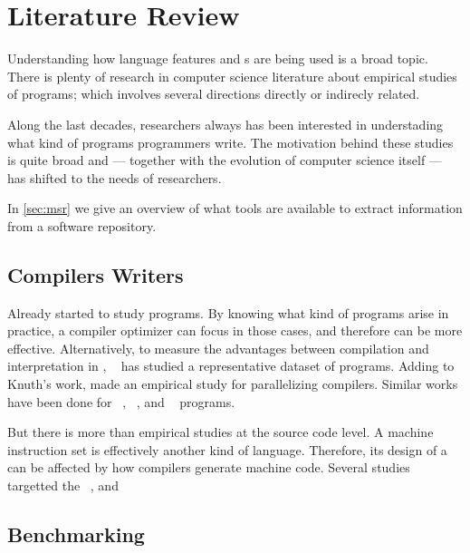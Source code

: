 
\chapter{Literature Review} \label{cha:literature-review} 

Understanding how language features and \api{}s are being used is a broad topic.
There is plenty of research in computer science literature about empirical studies of programs;
which involves several directions directly or indirecly related.

Along the last decades, researchers always has been interested in understading what kind of programs programmers write.
The motivation behind these studies is quite broad and --- together with the evolution of computer science itself --- has shifted to the needs of researchers.

In \cref{sec:msr} we give an overview of what tools are available to extract information from a software repository.

\section{Compilers Writers}

Already \cite{knuth_empirical_1971} started to study \fortran{} programs.
By knowing what kind of programs arise in practice, a compiler optimizer can focus in those cases, and therefore can be more effective.
Alternatively, to measure the advantages between compilation and interpretation in \basic{}, ~\cite{hammond_basic_1977} has studied a representative dataset of programs.
Adding to Knuth's work, \cite{shen_empirical_1990} made an empirical study for parallelizing compilers.
Similar works have been done for \cobol{}~\cite{salvadori_static_1975,chevance_static_1978}, \pascal{}~\cite{cook_contextual_1982}, and \apl{}~\cite{saal_properties_1975,saal_empirical_1977} programs.

But there is more than empirical studies at the source code level.
A machine instruction set is effectively another kind of language.
Therefore, its design of a can be affected by how compilers generate machine code.
Several studies targetted the \jvm{}~\cite{collberg_empirical_2007,odonoghue_bigram_2002,antonioli_analysis_1998}, and \lilith{}~\cite{cook_empirical_1989}

\section{Benchmarking}

